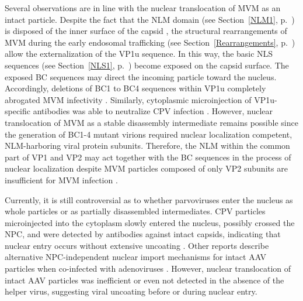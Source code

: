 Several observations are in line with the nuclear translocation of MVM as an intact particle. Despite the fact that the NLM domain (see Section~\ref{NLM1}, p.~\pageref{NLM1}) is disposed of the inner surface of the capsid \cite{pmid9817841}, the structural rearrangements of MVM during the early endosomal trafficking (see Section~\ref{Rearrangements}, p.~\pageref{Rearrangements}) allow the externalization of the VP1u sequence. In this way, the basic NLS sequences (see Section~\ref{NLS1}, p.~\pageref{NLS1}) become exposed on the capsid surface. The exposed BC sequences may direct the incoming particle toward the nucleus. Accordingly, deletions of BC1 to BC4 sequences within VP1u completely abrogated MVM infectivity \cite{pmid12072505}. Similarly, cytoplasmic microinjection of VP1u-specific antibodies was able to neutralize CPV infection \cite{pmid11799183}. However, nuclear translocation of MVM as a stable disassembly intermediate remains possible since the generation of BC1-4 mutant virions required nuclear localization competent, NLM-harboring viral protein subunits. Therefore, the NLM within the common part of VP1 and VP2 may act together with the BC sequences in the process of nuclear localization despite MVM particles composed of only VP2 subunits are insufficient for MVM infection \cite{pmid8416366, pmid12072505}.   



Currently, it is still controversial as to whether parvoviruses enter the nucleus as whole particles or as partially disassembled intermediates. CPV particles microinjected into the cytoplasm slowly entered the nucleus, possibly crossed the NPC, and were detected by antibodies against intact capsids, indicating that nuclear entry occurs without extensive uncoating \cite{pmid12970411, pmid10775624}. Other reports describe alternative NPC-independent nuclear import mechanisms for intact AAV particles when co-infected with adenoviruses \cite{pmid11592830, pmid12388712}. However, nuclear translocation of intact AAV particles was inefficient \cite{pmid16140755, pmid10684294, pmid11729319} or even not detected \cite{pmid16956943} in the absence of the helper virus, suggesting viral uncoating before or during nuclear entry.

